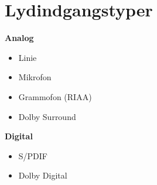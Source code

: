 \chapter{Lydindgangstyper}
\label{indgange}
\textbf{Analog}
\begin{itemize}
\item{Linie}
\item{Mikrofon}
\item{Grammofon (RIAA)}
\item{Dolby Surround}
\end{itemize}

\textbf{Digital}
\begin{itemize}
\item{S/PDIF}
\item{Dolby Digital}
\end{itemize}